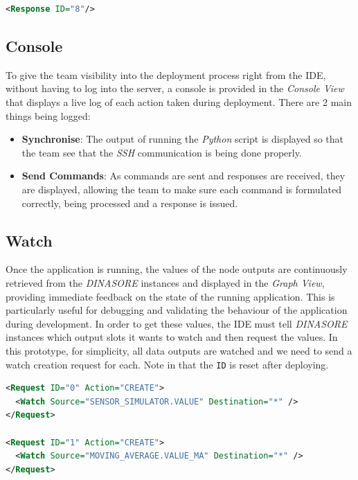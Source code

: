 \begin{lstlisting}[language=XML, caption={\texttt{Response} after a deployment command is sent}, label={lst:deploy-response}]
<Response ID="8"/>
\end{lstlisting}

\subsection{Console}
To give the team visibility into the deployment process right from the \ac{IDE}, without having to log into the server, a console is provided in the \textit{Console View} that displays a live log of each action taken during deployment. There are 2 main things being logged:

\begin{itemize}
  \item \textbf{Synchronise}: The output of running the \textit{Python} script is displayed so that the team see that the \textit{SSH} communication is being done properly.
  \item \textbf{Send Commands}: As commands are sent and responses are received, they are displayed, allowing the team to make sure each command is formulated correctly, being processed and a response is issued.
\end{itemize}


\subsection{Watch}
Once the application is running, the values of the node outputs are continuously retrieved from the \textit{DINASORE} instances and displayed in the \textit{Graph View}, providing immediate feedback on the state of the running application. This is particularly useful for debugging and validating the behaviour of the application during development. In order to get these values, the \ac{IDE} must tell \textit{DINASORE} instances which output slots it wants to watch and then request the values. In this prototype, for simplicity, all data outputs are watched and we need to send a watch creation request for each. Note in  that the \texttt{ID} is reset after deploying.

\begin{lstlisting}[language=XML, caption={\texttt{CREATE} watches after deploying}, label={lst:deploy-create-watch}]
<Request ID="0" Action="CREATE">
  <Watch Source="SENSOR_SIMULATOR.VALUE" Destination="*" />
</Request>

<Request ID="1" Action="CREATE">
  <Watch Source="MOVING_AVERAGE.VALUE_MA" Destination="*" />
</Request>
\end{lstlisting}

